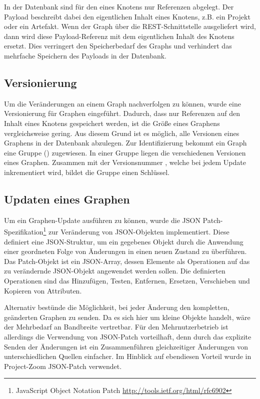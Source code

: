 In der Datenbank sind für den  eines Knotens nur Referenzen abgelegt. Der Payload beschreibt dabei den eigentlichen Inhalt eines Knotens, z.B. ein Projekt oder ein Artefakt. Wenn der Graph über die REST-Schnittstelle ausgeliefert wird, dann wird diese Payload-Referenz mit dem eigentlichen Inhalt des Knotens ersetzt. Dies verringert den Speicherbedarf des Graphs und verhindert das mehrfache Speichern des Payloads in der Datenbank.

\subsection{Versionierung}

Um die Veränderungen an einem Graph nachverfolgen zu können, wurde eine Versionierung für Graphen eingeführt. Dadurch, dass nur Referenzen auf den Inhalt eines Knotens gespeichert werden, ist die Größe eines Graphens vergleichsweise gering. Aus diesem Grund ist es möglich, alle Versionen eines Graphens in der Datenbank abzulegen. Zur Identifizierung bekommt ein Graph eine Gruppe () zugewiesen. In einer Gruppe liegen die verschiedenen Versionen eines Graphen. Zusammen mit der Versionsnummer , welche bei jedem Update inkrementiert wird, bildet die Gruppe einen Schlüssel.

\subsection{Updaten eines Graphen}

Um ein Graphen-Update ausführen zu können, wurde die JSON Patch-Spezifikation\footnote{JavaScript Object Notation Patch \url{http://tools.ietf.org/html/rfc6902}} zur Veränderung von JSON-Objekten implementiert. Diese definiert eine JSON-Struktur, um ein gegebenes Objekt durch die Anwendung einer geordneten Folge von Änderungen in einen neuen Zustand zu überführen. Das Patch-Objekt ist ein JSON-Array, dessen Elemente als Operationen auf das zu verändernde JSON-Objekt angewendet werden sollen. Die definierten Operationen sind das Hinzufügen, Testen, Entfernen, Ersetzen, Verschieben und Kopieren von Attributen.

Alternativ bestünde die Möglichkeit, bei jeder Änderung den kompletten, geänderten Graphen zu senden. Da es sich hier um kleine Objekte handelt, wäre der Mehrbedarf an Bandbreite vertretbar. Für den Mehrnutzerbetrieb ist allerdings die Verwendung von JSON-Patch vorteilhaft, denn durch das explizite Senden der Änderungen ist ein Zusammenführen gleichzeitiger Änderungen von unterschiedlichen Quellen einfacher. Im Hinblick auf ebendiesen Vorteil wurde in Project-Zoom JSON-Patch verwendet.

